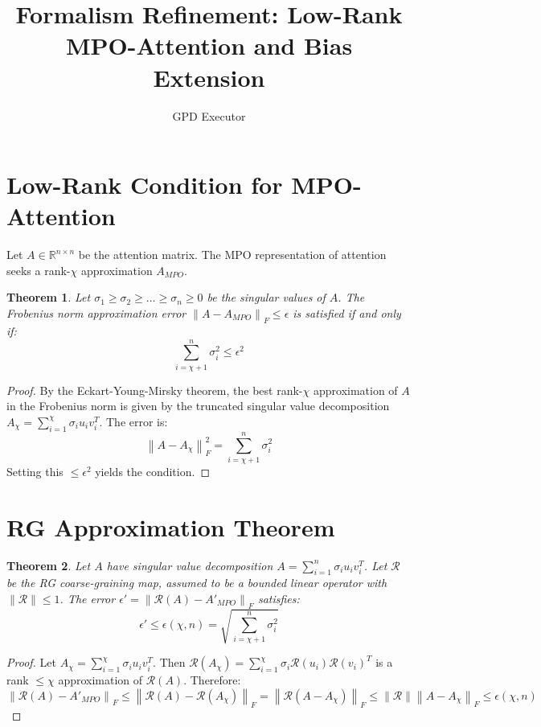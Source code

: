 \documentclass{article}
\title{Formalism Refinement: Low-Rank MPO-Attention and Bias Extension}
\author{GPD Executor}
\newtheorem{theorem}{Theorem}
\begin{document}
\section{Low-Rank Condition for MPO-Attention}

Let $A \in \mathbb{R}^{n \times n}$ be the attention matrix. The MPO representation of attention seeks a rank-$\chi$ approximation $A_{MPO}$.

\begin{theorem}
Let $\sigma_1 \ge \sigma_2 \ge \dots \ge \sigma_n \ge 0$ be the singular values of $A$. The Frobenius norm approximation error $\left\| A - A_{MPO} \right\|_F \le \epsilon$ is satisfied if and only if:
\[ \sum_{i=\chi+1}^n \sigma_i^2 \le \epsilon^2 \]
\end{theorem}

\begin{proof}
By the Eckart-Young-Mirsky theorem, the best rank-$\chi$ approximation of $A$ in the Frobenius norm is given by the truncated singular value decomposition $A_\chi = \sum_{i=1}^\chi \sigma_i u_i v_i^T$. The error is:
\[ \left\| A - A_\chi \right\|_F^2 = \sum_{i=\chi+1}^n \sigma_i^2 \]
Setting this $\le \epsilon^2$ yields the condition.
\end{proof}

\section{RG Approximation Theorem}

\begin{theorem}
Let $A$ have singular value decomposition $A = \sum_{i=1}^n \sigma_i u_i v_i^T$. Let $\mathcal{R}$ be the RG coarse-graining map, assumed to be a bounded linear operator with $\|\mathcal{R}\| \le 1$.
The error $\epsilon' = \left\| \mathcal{R}(A) - A'_{MPO} \right\|_F$ satisfies:
\[ \epsilon' \le \epsilon(\chi, n) = \sqrt{\sum_{i=\chi+1}^n \sigma_i^2} \]
\end{theorem}

\begin{proof}
Let $A_\chi = \sum_{i=1}^\chi \sigma_i u_i v_i^T$. Then $\mathcal{R}(A_\chi) = \sum_{i=1}^\chi \sigma_i \mathcal{R}(u_i) \mathcal{R}(v_i)^T$ is a rank $\le \chi$ approximation of $\mathcal{R}(A)$.
Therefore:
\[ \left\| \mathcal{R}(A) - A'_{MPO} \right\|_F \le \left\| \mathcal{R}(A) - \mathcal{R}(A_\chi) \right\|_F = \left\| \mathcal{R}(A - A_\chi) \right\|_F \le \|\mathcal{R}\| \left\| A - A_\chi \right\|_F \le \epsilon(\chi, n) \]
\end{proof}
\end{document}
